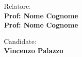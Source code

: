 \begin{titlepage}
\begin{minipage}[t]{0.47\textwidth}
	{\large{Relatore:}{\normalsize\vspace{3mm}
	\bf\\ \large{Prof: Nome Cognome} \normalsize\vspace{3mm}\bf \\ \large{Prof: Nome Cognome}}}
\end{minipage}
\hfill
\begin{minipage}[t]{0.47\textwidth}\raggedleft
	{\large{Candidate:}{\normalsize\vspace{3mm} \bf\\ \large{Vincenzo Palazzo}}}
\end{minipage}

\vspace{30mm}

\end{titlepage}
